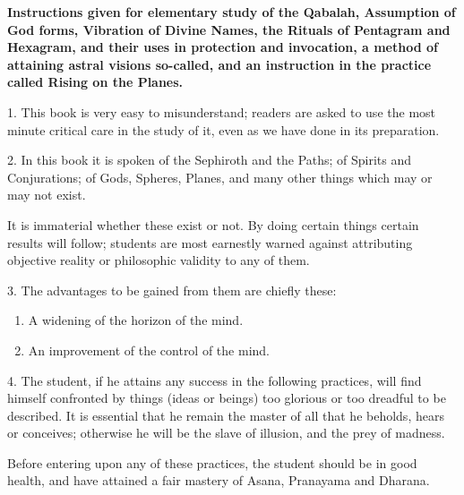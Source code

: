 \textbf{Instructions given for elementary study of the Qabalah, Assumption of God forms, Vibration of Divine Names, the Rituals of Pentagram and Hexagram, and their uses in protection and invocation, a method of attaining astral visions so-called, and an instruction in the practice called Rising on the Planes.}


1. This book is very easy to misunderstand; readers are asked to use the most minute critical care in the study of it, even as we have done in its preparation.

2. In this book it is spoken of the Sephiroth and the Paths; of Spirits and Conjurations; of Gods, Spheres, Planes, and many other things which may or may not exist.

It is immaterial whether these exist or not. By doing certain things certain results will follow; students are most earnestly warned against attributing objective reality or philosophic validity to any of them.

3. The advantages to be gained from them are chiefly these:

\begin{enumerate}[label=(\textit{\alph*})]
\item A widening of the horizon of the mind.
\item An improvement of the control of the mind.
\end{enumerate}

4. The student, if he attains any success in the following practices, will find himself confronted by things (ideas or beings) too glorious or too dreadful to be described. It is essential that he remain the master of all that he beholds, hears or conceives; otherwise he will be the slave of illusion, and the prey of madness.

Before entering upon any of these practices, the student should be in good health, and have attained a fair mastery of Asana, Pranayama and Dharana.

